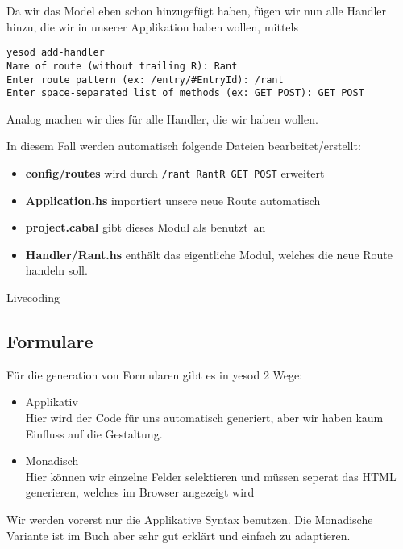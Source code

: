 \documentclass{beamer}
\begin{document}
\begin{frame}[fragile]
Da wir das Model eben schon hinzugefügt haben, fügen wir nun alle Handler hinzu, die wir in unserer Applikation haben wollen, mittels
\footnotesize
\begin{verbatim}
yesod add-handler
Name of route (without trailing R): Rant
Enter route pattern (ex: /entry/#EntryId): /rant
Enter space-separated list of methods (ex: GET POST): GET POST
\end{verbatim}
\normalsize
\pause
Analog machen wir dies für alle Handler, die wir haben wollen.\\\par\pause
In diesem Fall werden automatisch folgende Dateien bearbeitet/erstellt:
\begin{itemize}
 \item \textbf{config/routes} wird durch \texttt{/rant RantR GET POST} erweitert
 \pause
 \item \textbf{Application.hs} importiert unsere neue Route automatisch
 \pause
 \item \textbf{project.cabal} gibt dieses Modul als \glqq benutzt\grqq \ an
 \pause
 \item \textbf{Handler/Rant.hs} enthält das eigentliche Modul, welches die neue Route handeln soll.
\end{itemize}

\end{frame}

\begin{frame}
Livecoding
\end{frame}

\subsection{Formulare}

\begin{frame}[fragile]
Für die generation von Formularen gibt es in yesod 2 Wege:\pause
\begin{itemize}
 \item Applikativ\pause\\
       Hier wird der Code für uns automatisch generiert, aber wir haben kaum Einfluss auf die Gestaltung.
 \pause
 \item Monadisch\pause\\
       Hier können wir einzelne Felder selektieren und müssen seperat das HTML generieren, welches im Browser angezeigt wird
\end{itemize}
\pause
Wir werden vorerst nur die Applikative Syntax benutzen. Die Monadische Variante ist im Buch aber sehr gut erklärt und einfach zu adaptieren.
\end{frame}
\end{document}
